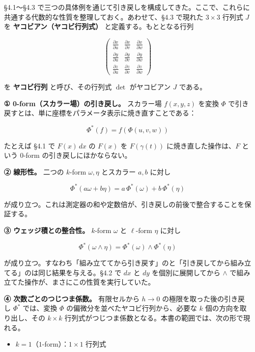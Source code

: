 \documentclass[a4paper,12pt,openany]{book}
\providecommand{\tightlist}{%
  \setlength{\itemsep}{0pt}\setlength{\parskip}{0pt}}
\begin{document}
§4.1〜§4.3
で三つの具体例を通じて引き戻しを構成してきた。ここで、これらに共通する代数的な性質を整理しておく。あわせて、§4.3
で現れた \(3 \times 3\) 行列式 \(J\) を
\textbf{ヤコビアン（ヤコビ行列式）} と定義する。もととなる行列

\[\begin{pmatrix}
\frac{\partial x}{\partial u} & \frac{\partial x}{\partial v} & \frac{\partial x}{\partial w} \\[4pt]
\frac{\partial y}{\partial u} & \frac{\partial y}{\partial v} & \frac{\partial y}{\partial w} \\[4pt]
\frac{\partial z}{\partial u} & \frac{\partial z}{\partial v} & \frac{\partial z}{\partial w}
\end{pmatrix}\]

を \textbf{ヤコビ行列} と呼び、その行列式 \(\det\) がヤコビアン \(J\)
である。

\textbf{① 0-form（スカラー場）の引き戻し。} スカラー場 \(f(x,y,z)\)
を変換 \(\Phi\)
で引き戻すとは、単に座標をパラメータ表示に焼き直すことである：

\[\Phi^*(f) = f(\Phi(u,v,w))\]

たとえば §4.1 で \(F(x)\,dx\) の \(F(x)\) を \(F(\gamma(t))\)
に焼き直した操作は、\(F\) という \(0\)-form の引き戻しにほかならない。

\textbf{② 線形性。} 二つの \(k\)-form \(\omega, \eta\) とスカラー
\(a,b\) に対し

\[\Phi^*(a\omega + b\eta) = a\,\Phi^*(\omega) + b\,\Phi^*(\eta)\]

が成り立つ。これは測定器の和や定数倍が、引き戻しの前後で整合することを保証する。

\textbf{③ ウェッジ積との整合性。} \(k\)-form \(\omega\) と \(\ell\)-form
\(\eta\) に対し

\[\Phi^*(\omega \wedge \eta) = \Phi^*(\omega) \wedge \Phi^*(\eta)\]

が成り立つ。すなわち「組み立ててから引き戻す」のと「引き戻してから組み立てる」のは同じ結果を与える。§4.2
で \(dx\) と \(dy\) を個別に展開してから \(\wedge\)
で組み立てた操作が、まさにこの性質を実行していた。

\textbf{④ 次数ごとのつじつま係数。} 有限セルから \(h\to0\)
の極限を取った後の引き戻し \(\Phi^*\) では、変換 \(\Phi\)
の偏微分を並べたヤコビ行列から、必要な \(k\) 個の方向を取り出し、その
\(k \times k\)
行列式がつじつま係数となる。本書の範囲では、次の形で現れる。

\begin{itemize}
\tightlist
\item
  \(k=1\)（\(1\)-form）：\(1 \times 1\) 行列式
\end{itemize}
\end{document}
